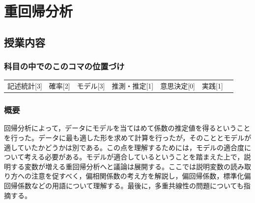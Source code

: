 \section{重回帰分析}
\label{lesson10}

\subsection{授業内容}
\subsubsection{科目の中でのこのコマの位置づけ}
\begin{tabular}[t]{ccccccc}
    記述統計[3] & 確率[2] & モデル[3] & 推測・推定[1] & 意思決定[0] & 実践[1]
\end{tabular}

\subsubsection{概要}
回帰分析によって，データにモデルを当てはめて係数の推定値を得るということを行った。データに最も適した形を求めて計算を行ったが，そのこととモデルが適していたかどうかは別である。この点を理解するためには，モデルの適合度について考える必要がある。モデルが適合しているということを踏まえた上で，説明する変数が増える重回帰分析へと議論は展開する。ここでは説明変数の読み取り方への注意を促すべく，偏相関係数の考え方を解説し，偏回帰係数，標準化偏回帰係数などの用語について理解する。最後に，多重共線性の問題についても指摘する。
